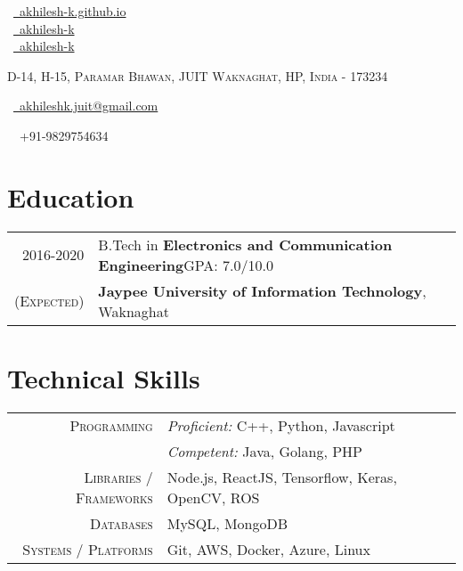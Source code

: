 \documentclass[a4paper,10pt]{extarticle}
\begin{document}
\pagestyle{empty}

\begin{multicols}{3}
\normalsize  \faGlobe\ {\href{http://akhilesh-k.github.io/}{\  akhilesh-k.github.io}}\\
\normalsize \faGithub\ {\href{https://github.com/akhilesh-k}{\  akhilesh-k}}\\
\normalsize  \faLinkedinSquare\ {\href{https://www.linkedin.com/in/akhilesh-k}{\  akhilesh-k}}\\
\columnbreak
\normalsize\par{\par}
\par{\centering\normalsize {\textsc{D-14, H-15, Paramar Bhawan, JUIT Waknaghat, HP, India - 173234}}\hfill\par}
\columnbreak
\raggedright\hfill\normalsize \faEnvelope\ {\href{mailto:akhileshk.juit@gmail.com}{\  akhileshk.juit@gmail.com}}\\
\raggedright\hfill{\faPhone\ \  +91-9829754634}
\end{multicols}

\vspace{-0.6cm}
\section{\textcolor{primary}{Education}}
\begin{tabular}{r|p{17.5cm}}	
2016-2020 & B.Tech in \textbf{Electronics and Communication Engineering}\hfill\textsc{GPA}: 7.0/10.0\\
\textsc{(Expected)}&\textbf{Jaypee University of Information Technology}, Waknaghat\\

\end{tabular}
\section{\textcolor{primary}{Technical Skills}}

\begin{tabular}{r|p{15cm}}
\textsc{Programming} & \textit{Proficient:} C++, Python, Javascript\\
& \textit{Competent:} Java, Golang, PHP \\
\textsc{Libraries / Frameworks} & Node.js, ReactJS, Tensorflow, Keras, OpenCV, ROS\\
\textsc{Databases} & MySQL, MongoDB\\
\textsc{Systems / Platforms} & Git, AWS, Docker, Azure, Linux\\
\end{tabular}
\end{document}
